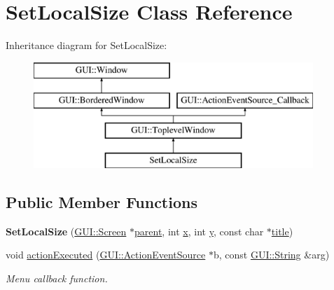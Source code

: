 \hypertarget{classSetLocalSize}{\section{Set\-Local\-Size Class Reference}
\label{classSetLocalSize}
}
Inheritance diagram for Set\-Local\-Size\-:\begin{figure}[H]
\begin{center}
\leavevmode
\includegraphics[height=4.000000cm]{classSetLocalSize}
\end{center}
\end{figure}
\subsection*{Public Member Functions}
\begin{DoxyCompactItemize}
\item 
\hypertarget{classSetLocalSize_ad879d8b7630efd7dae269f86b2f48167}{{\bfseries Set\-Local\-Size} (\hyperlink{classGUI_1_1Screen}{G\-U\-I\-::\-Screen} $\ast$\hyperlink{classGUI_1_1Window_a2e593ff65e7702178d82fe9010a0b539}{parent}, int \hyperlink{classGUI_1_1Window_a6ca6a80ca00c9e1d8ceea8d3d99a657d}{x}, int \hyperlink{classGUI_1_1Window_a0ee8e923aff2c3661fc2e17656d37adf}{y}, const char $\ast$\hyperlink{classGUI_1_1ToplevelWindow_a04de191f9a57b5b584657866a4ac6843}{title})}\label{classSetLocalSize_ad879d8b7630efd7dae269f86b2f48167}

\item 
\hypertarget{classSetLocalSize_ab71c2d90d683ddc1fdd31ee3fe972fa0}{void \hyperlink{classSetLocalSize_ab71c2d90d683ddc1fdd31ee3fe972fa0}{action\-Executed} (\hyperlink{classGUI_1_1ActionEventSource}{G\-U\-I\-::\-Action\-Event\-Source} $\ast$b, const \hyperlink{classGUI_1_1String}{G\-U\-I\-::\-String} \&arg)}\label{classSetLocalSize_ab71c2d90d683ddc1fdd31ee3fe972fa0}

\begin{DoxyCompactList}\small\item\em Menu callback function. \end{DoxyCompactList}\end{DoxyCompactItemize}
